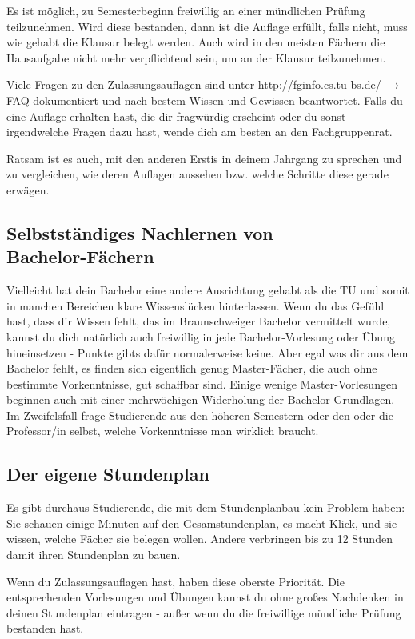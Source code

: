 \begin{multicols}{2}
	Es ist möglich, zu Semesterbeginn freiwillig an einer mündlichen Prüfung teilzunehmen. Wird diese bestanden, dann ist die Auflage erfüllt, falls nicht, muss wie gehabt die Klausur belegt werden. Auch wird in den meisten Fächern die Hausaufgabe nicht mehr verpflichtend sein, um an der Klausur teilzunehmen.

	Viele Fragen zu den Zulassungsauflagen sind unter \url{http://fginfo.cs.tu-bs.de/} $\rightarrow$ FAQ dokumentiert und nach bestem Wissen und Gewissen beantwortet. Falls du eine Auflage erhalten hast, die dir fragwürdig erscheint oder du sonst irgendwelche Fragen dazu hast, wende dich am besten an den Fachgruppenrat.

	Ratsam ist es auch, mit den anderen Erstis in deinem Jahrgang zu sprechen und zu vergleichen, wie deren Auflagen aussehen bzw. welche Schritte diese gerade erwägen. 

	\subsection{Selbstständiges Nachlernen von \\ Bachelor-Fächern}
		Vielleicht hat dein Bachelor eine andere Ausrichtung gehabt als die TU und somit in manchen Bereichen klare Wissenslücken hinterlassen. Wenn du das Gefühl hast, dass dir Wissen fehlt, das im Braunschweiger Bachelor vermittelt wurde, kannst du dich natürlich auch freiwillig in jede Bachelor-Vorlesung oder Übung hineinsetzen - Punkte gibts dafür normalerweise keine. Aber egal was dir aus dem Bachelor fehlt, es finden sich eigentlich genug Master-Fächer, die auch ohne bestimmte Vorkenntnisse, gut schaffbar sind. Einige wenige Master-Vorlesungen beginnen auch mit einer mehrwöchigen Widerholung der Bachelor-Grundlagen. Im Zweifelsfall frage Studierende aus den höheren Semestern oder den oder die Professor/in selbst, welche Vorkenntnisse man wirklich braucht.

	\subsection{Der eigene Stundenplan}
		\label{masterstundenplan}
		Es gibt durchaus Studierende, die mit dem Stundenplanbau kein Problem haben: Sie schauen einige Minuten auf den Gesamstundenplan, es macht Klick, und sie wissen, welche Fächer sie belegen wollen. Andere verbringen bis zu 12 Stunden damit ihren Stundenplan zu bauen.

		Wenn du Zulassungsauflagen hast, haben diese oberste Priorität. Die entsprechenden Vorlesungen und Übungen kannst du ohne großes Nachdenken in deinen Stundenplan eintragen - außer wenn du die freiwillige mündliche Prüfung bestanden hast.


\end{multicols}
